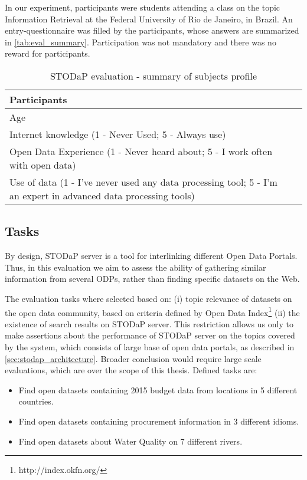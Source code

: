 In our experiment, participants were students attending a class on the topic Information Retrieval at the Federal University of Rio de Janeiro, in Brazil.
An entry-questionnaire was filled by the participants, whose answers are summarized in \autoref{tab:eval_summary}.
Participation was not mandatory and there was no reward for participants.

\begin{table}[]
\ABNTEXfontereduzida
\centering
\caption{STODaP evaluation - summary of subjects profile}
\label{tab:eval_summary}
\begin{tabular}{|p{8cm}|p{2cm}|}
\hline
Participants & \\ \hline
Age & \\ \hline
Internet knowledge (1 - Never Used; 5 - Always use) & \\ \hline
Open Data Experience (1 - Never heard about; 5 - I work often with open data) & \\ \hline
Use of data (1 - I've never used any data processing tool; 5 - I'm an expert in advanced data processing tools) & \\ \hline
\end{tabular}
\end{table}

\subsection{Tasks}

By design, STODaP server is a tool for interlinking different Open Data Portals.
Thus, in this evaluation we aim to assess the ability of gathering similar information from several ODPs, rather than finding specific datasets on the Web.

The evaluation tasks where selected based on: (i) topic relevance of datasets on the open data community, based on criteria defined by Open Data Index\footnote{http://index.okfn.org/} (ii) the existence of search results on STODaP server.
This restriction allows us only to make assertions about the performance of STODaP server on the topics covered by the system, which consists of large base of open data portals, as described in \autoref{sec:stodap_architecture}.
Broader conclusion would require large scale evaluations, which are over the scope of this thesis.
Defined tasks are:

\begin{itemize}
	\item Find open datasets containing 2015 budget data from locations in 5 different countries.
	\item Find open datasets containing procurement information in 3 different idioms.
	\item Find open datasets about Water Quality on 7 different rivers.
\end{itemize}

